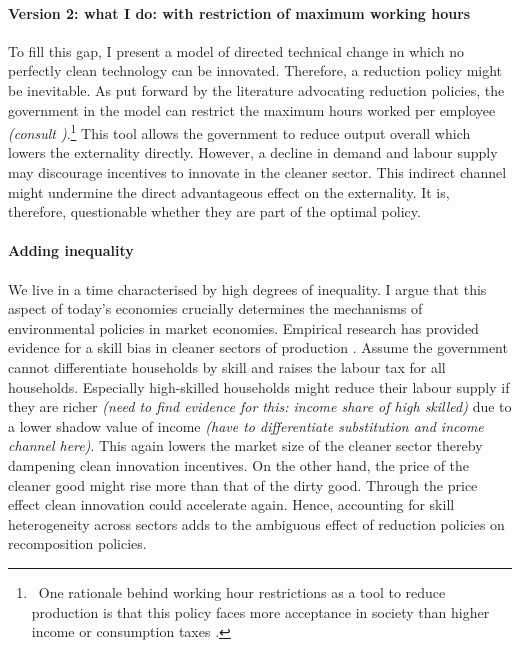 \documentclass[12pt]{article}
\begin{document}
\paragraph{Version 2: what I do: with restriction of maximum working hours}
To fill this gap, I present a model of directed technical change in which no perfectly clean technology can be innovated. Therefore, a reduction policy might be inevitable. As put forward by the literature advocating reduction policies, the government in the model can restrict the maximum hours worked per employee \textit{(consult \cite{Schor2005SustainableReduction})}.\footnote{\ One rationale behind working hour restrictions as a tool to reduce production is that this policy faces more acceptance in society than higher income or consumption taxes \citep[e.g.][]{Schor2005SustainableReduction, Alvarez-Cuadrado2007EnvyHours}.}
This tool allows the government to reduce output overall which lowers the externality directly.
However, a decline in demand and labour supply may discourage incentives to innovate in the cleaner sector. This indirect channel might undermine the direct advantageous effect on the externality. It is, therefore, questionable whether they are part of the optimal policy.

\paragraph{Adding inequality}
We live in a time characterised by high degrees of inequality. I argue that this aspect of today's economies crucially determines the mechanisms of environmental policies in market economies. Empirical research has provided evidence for a skill bias in cleaner sectors of production \citep{Consoli2016DoCapital}. Assume the government cannot differentiate households by skill and raises the labour tax for all households. Especially high-skilled households might reduce their labour supply if they are richer \textit{(need to find evidence for this: income share of high skilled)} due to a lower shadow value of income \textit{(have to differentiate substitution and income channel here)}. This again lowers the market size of the cleaner sector thereby dampening clean innovation incentives. On the other hand, the price of the cleaner good might rise more than that of the dirty good. Through the price effect clean innovation could accelerate again. Hence, accounting for skill heterogeneity across sectors adds to the ambiguous effect of reduction policies on recomposition policies.
\end{document}
